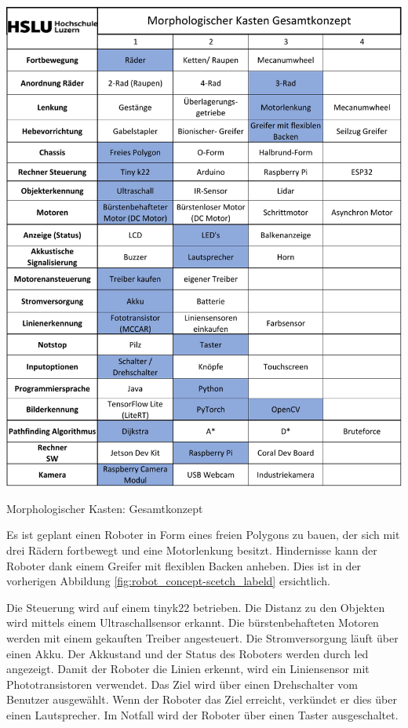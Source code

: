 \begin{table}[H]
\centering
\includegraphics[width=\textwidth -20mm]{assets/MK-all.pdf}
\caption{Morphologischer Kasten: Gesamtkonzept}
\label{table:mk-all}
\end{table}

Es ist geplant einen Roboter in Form eines freien Polygons zu bauen, der sich mit drei Rädern fortbewegt und eine Motorlenkung besitzt. Hindernisse kann der Roboter dank einem Greifer mit flexiblen Backen anheben. Dies ist in der vorherigen Abbildung \ref{fig:robot_concept-scetch_labeld} ersichtlich.

Die Steuerung wird auf einem \gls{tinyk22} betrieben. Die Distanz zu den Objekten wird mittels einem Ultraschallsensor erkannt. Die bürstenbehafteten Motoren werden mit einem gekauften Treiber angesteuert. Die Stromversorgung läuft über einen Akku. Der Akkustand und der Status des Roboters werden durch \acrfull{led} angezeigt. Damit der Roboter die Linien erkennt, wird ein Liniensensor mit Phototransistoren verwendet. Das Ziel wird über einen Drehschalter vom Benutzer ausgewählt.
Wenn der Roboter das Ziel erreicht, verkündet er dies über einen Lautsprecher. Im Notfall wird der Roboter über einen Taster ausgeschaltet.

